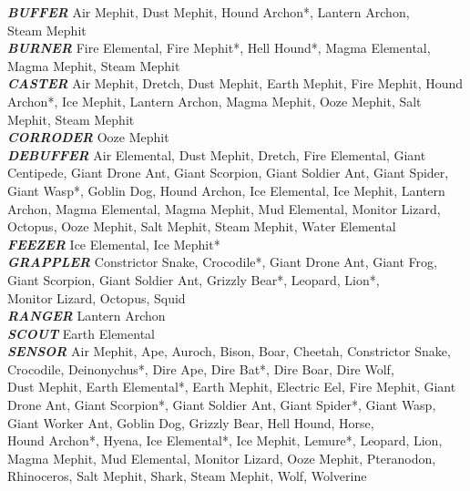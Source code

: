 \vspace{5pt}

\textbf{\textit{BUFFER}} Air Mephit, Dust Mephit, Hound Archon*, Lantern Archon, \\ Steam Mephit \\

\textbf{\textit{BURNER}} Fire Elemental, Fire Mephit*, Hell Hound*, Magma Elemental, \\ Magma Mephit, Steam Mephit \\

\textbf{\textit{CASTER}} Air Mephit, Dretch, Dust Mephit, Earth Mephit, Fire Mephit, Hound Archon*, Ice Mephit, Lantern Archon, Magma Mephit, Ooze Mephit, Salt Mephit, Steam Mephit \\

\textbf{\textit{CORRODER}} Ooze Mephit \\

\textbf{\textit{DEBUFFER}} Air Elemental, Dust Mephit, Dretch, Fire Elemental, Giant Centipede, Giant Drone Ant, Giant Scorpion, Giant Soldier Ant, Giant Spider, Giant Wasp*, Goblin Dog, Hound Archon, Ice Elemental, Ice Mephit, Lantern Archon, Magma Elemental, Magma Mephit, Mud Elemental, Monitor Lizard, Octopus, Ooze Mephit, Salt Mephit, Steam Mephit, Water Elemental \\

\textbf{\textit{FEEZER}} Ice Elemental, Ice Mephit* \\

\textbf{\textit{GRAPPLER}} Constrictor Snake, Crocodile*, Giant Drone Ant, Giant Frog, Giant Scorpion, Giant Soldier Ant, Grizzly Bear*, Leopard, Lion*, \\ Monitor Lizard, Octopus, Squid \\

\textbf{\textit{RANGER}} Lantern Archon \\

\textbf{\textit{SCOUT}} Earth Elemental \\

\textbf{\textit{SENSOR}} Air Mephit, Ape, Auroch, Bison, Boar, Cheetah, Constrictor Snake, Crocodile, Deinonychus*, Dire Ape, Dire Bat*, Dire Boar, Dire Wolf, \\ Dust Mephit, Earth Elemental*, Earth Mephit, Electric Eel, Fire Mephit, Giant Drone Ant, Giant Scorpion*, Giant Soldier Ant, Giant Spider*, Giant Wasp, Giant Worker Ant, Goblin Dog, Grizzly Bear, Hell Hound, Horse, \\ Hound Archon*, Hyena, Ice Elemental*, Ice Mephit, Lemure*, Leopard, Lion, Magma Mephit, Mud Elemental, Monitor Lizard, Ooze Mephit, Pteranodon, Rhinoceros, Salt Mephit, Shark, Steam Mephit, Wolf, Wolverine \\

